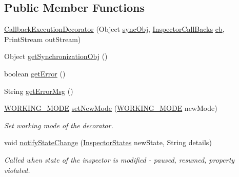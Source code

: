 \subsection*{Public Member Functions}
\begin{DoxyCompactItemize}
\item 
\hyperlink{classgov_1_1nasa_1_1jpf_1_1inspector_1_1client_1_1_callback_execution_decorator_aacf2c69b13a2501cbcd42bd3b484220f}{Callback\+Execution\+Decorator} (Object \hyperlink{classgov_1_1nasa_1_1jpf_1_1inspector_1_1client_1_1_callback_execution_decorator_a44534c6f15095fc46c7e6cddc7e379da}{sync\+Obj}, \hyperlink{interfacegov_1_1nasa_1_1jpf_1_1inspector_1_1interfaces_1_1_inspector_call_backs}{Inspector\+Call\+Backs} \hyperlink{classgov_1_1nasa_1_1jpf_1_1inspector_1_1client_1_1_callback_execution_decorator_a3368e5a926aa09b3c9bd244ee790f3f3}{cb}, Print\+Stream out\+Stream)
\item 
Object \hyperlink{classgov_1_1nasa_1_1jpf_1_1inspector_1_1client_1_1_callback_execution_decorator_af8ae65d93762c7c5fe2fc01ed3315ea8}{get\+Synchronization\+Obj} ()
\item 
boolean \hyperlink{classgov_1_1nasa_1_1jpf_1_1inspector_1_1client_1_1_callback_execution_decorator_a3621ff7fc721c0d87b7bb458bdad090b}{get\+Error} ()
\item 
String \hyperlink{classgov_1_1nasa_1_1jpf_1_1inspector_1_1client_1_1_callback_execution_decorator_a9a50878a9a49b56195be2b98b238268c}{get\+Error\+Msg} ()
\item 
\hyperlink{enumgov_1_1nasa_1_1jpf_1_1inspector_1_1client_1_1_callback_execution_decorator_1_1_w_o_r_k_i_n_g___m_o_d_e}{W\+O\+R\+K\+I\+N\+G\+\_\+\+M\+O\+DE} \hyperlink{classgov_1_1nasa_1_1jpf_1_1inspector_1_1client_1_1_callback_execution_decorator_adfb741947c04bc9ab6d9c7c8652c6b5a}{set\+New\+Mode} (\hyperlink{enumgov_1_1nasa_1_1jpf_1_1inspector_1_1client_1_1_callback_execution_decorator_1_1_w_o_r_k_i_n_g___m_o_d_e}{W\+O\+R\+K\+I\+N\+G\+\_\+\+M\+O\+DE} new\+Mode)
\begin{DoxyCompactList}\small\item\em Set working mode of the decorator. \end{DoxyCompactList}\item 
void \hyperlink{classgov_1_1nasa_1_1jpf_1_1inspector_1_1client_1_1_callback_execution_decorator_a1838e77e774ed9be252c2e68586338af}{notify\+State\+Change} (\hyperlink{enumgov_1_1nasa_1_1jpf_1_1inspector_1_1interfaces_1_1_commands_interface_1_1_inspector_states}{Inspector\+States} new\+State, String details)
\begin{DoxyCompactList}\small\item\em Called when state of the inspector is modified -\/ paused, resumed, property violated. \end{DoxyCompactList}\item 

\end{DoxyCompactItemize}
